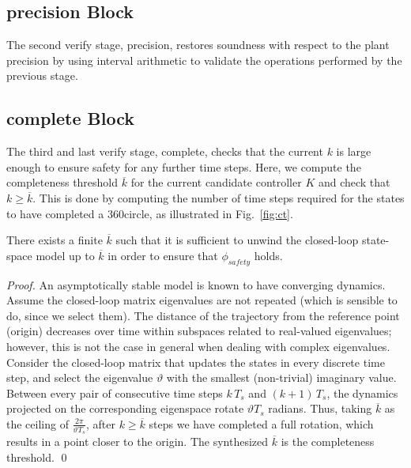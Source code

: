 \subsection{{\sc precision} Block}

The second {\sc verify} stage, {\sc precision}, 
 restores soundness with respect to the plant precision
by using interval arithmetic \cite{moore1966interval} to validate the 
operations performed by the previous stage. 

\subsection{{\sc complete} Block}

The third and last {\sc verify} stage, {\sc complete}, checks that the current
$k$ is large enough to ensure safety for any further time steps.  
Here, we compute the completeness threshold $\overline{k}$ for the current candidate controller $K$ and
check that $k{\geq}\overline{k}$.  This is done by computing the number of time steps
required for the states to have completed a 360\textdegree circle, as illustrated in Fig.~\ref{fig:ct}. 

\begin{theorem} There exists a finite $\overline{k}$ such that it is
sufficient to unwind the closed-loop state-space model up to $\overline{k}$
in order to ensure that $\phi_\mathit{safety}$ holds. 
\end{theorem}

\begin{proof}
%
An asymptotically stable model is known to have converging dynamics.  Assume the
closed-loop matrix eigenvalues are not repeated (which is sensible to do,
since we select them).  The distance of the trajectory from the reference
point (origin) decreases over time within subspaces related to real-valued
eigenvalues; however, this is not the case in general when dealing with
complex eigenvalues.  Consider the closed-loop matrix that updates the
states in every discrete time step, and select the eigenvalue $\vartheta$
with the smallest (non-trivial) imaginary value.  Between every pair of
consecutive time steps $k\,T_s$ and $(k+1)\,T_s$, the dynamics projected on
the corresponding eigenspace rotate $\vartheta T_s$ radians.  Thus, taking
$\overline{k}$ as the ceiling of $\frac{2\pi}{\vartheta T_s}$, after
$k{\geq}\overline{k}$ steps we have completed a full rotation, which results
in a point closer to the origin.  The synthesized $\overline{k}$ is the completeness threshold.
\qed 
%
\end{proof}



